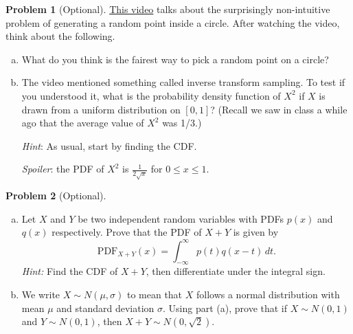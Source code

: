 \documentclass[11pt,oneside]{amsart}
\theoremstyle{definition}
\newtheorem{problem}{Problem}
\begin{document}
    \begin{problem}[Optional]
        \href{https://www.youtube.com/watch?v=4y_nmpv-9lI}{This video} talks about the surprisingly non-intuitive problem of generating a random point inside a circle. After watching the video, think about the following.
        \begin{enumerate}[(a)]
            \item What do you think is the fairest way to pick a random point on a circle?
            \item The video mentioned something called inverse transform sampling. To test if you understood it, what is the probability density function of $X^2$ if $X$ is drawn from a uniform distribution on $[0,1]$? (Recall we saw in class a while ago that the average value of $X^2$ was 1/3.)
            
            \emph{Hint}: As usual, start by finding the CDF.

            \emph{Spoiler}: the PDF of $X^2$ is $\frac 1{2\sqrt x}$ for $0\leq x\leq 1$.
        \end{enumerate}
    \end{problem}

    \begin{problem}[Optional]
        \leavevmode\begin{enumerate}[(a)]
            \item Let $X$ and $Y$ be two independent random variables with PDFs $p(x)$ and $q(x)$ respectively. Prove that the PDF of $X+Y$ is given by
            \[\mathrm{PDF}_{X+Y}(x)=\int_{-\infty}^\infty p(t)q(x-t)\,dt.\]
            \emph{Hint:} Find the CDF of $X+Y$, then differentiate under the integral sign.
            \item We write $X\sim N(\mu,\sigma)$ to mean that $X$ follows a normal distribution with mean $\mu$ and standard deviation $\sigma$. Using part (a), prove that if $X\sim N(0,1)$ and $Y\sim N(0,1)$, then $X+Y\sim N(0,\sqrt 2)$.
        \end{enumerate}
    \end{problem}
\end{document}
